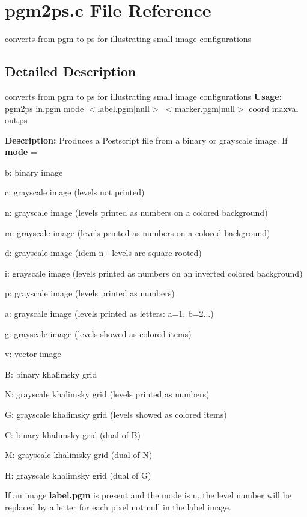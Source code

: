 \section{pgm2ps.c File Reference}
\label{pgm2ps_8c}


converts from pgm to ps for illustrating small image configurations  




\subsection{Detailed Description}
converts from pgm to ps for illustrating small image configurations {\bfseries Usage:} pgm2ps in.pgm mode $<$label.pgm$|$null$>$ $<$marker.pgm$|$null$>$ coord maxval out.ps

{\bfseries Description:} Produces a Postscript file from a binary or grayscale image. If {\bfseries mode} = \begin{DoxyItemize}
\item b: binary image \item c: grayscale image (levels not printed) \item n: grayscale image (levels printed as numbers on a colored background) \item m: grayscale image (levels printed as numbers on a colored background) \item d: grayscale image (idem n -\/ levels are square-\/rooted) \item i: grayscale image (levels printed as numbers on an inverted colored background) \item p: grayscale image (levels printed as numbers) \item a: grayscale image (levels printed as letters: a=1, b=2...) \item g: grayscale image (levels showed as colored items) \item v: vector image \item B: binary khalimsky grid \item N: grayscale khalimsky grid (levels printed as numbers) \item G: grayscale khalimsky grid (levels showed as colored items) \item C: binary khalimsky grid (dual of B) \item M: grayscale khalimsky grid (dual of N) \item H: grayscale khalimsky grid (dual of G)\end{DoxyItemize}
If an image {\bfseries label.pgm} is present and the mode is n, the level number will be replaced by a letter for each pixel not null in the label image.

